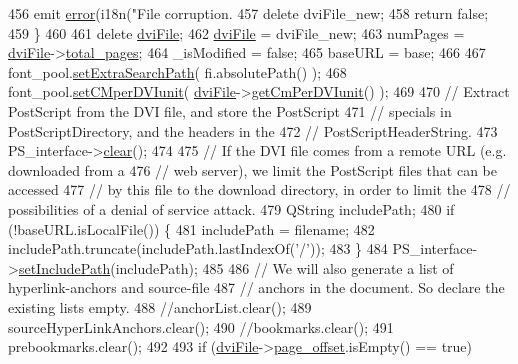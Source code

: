 \begin{DoxyCode}
{456       emit \hyperlink{classdviRenderer_ac3e658a3f6b99c724413fc1f5663f976}{error}(i18n(\textcolor{stringliteral}{"File corruption. %
457     \textcolor{keyword}{delete} dviFile\_new;
458     \textcolor{keywordflow}{return} \textcolor{keyword}{false};
459   \}
460 
461   \textcolor{keyword}{delete} \hyperlink{classdviRenderer_a67ded13a1a8da343aa0ee921ed96d4c2}{dviFile};
462   \hyperlink{classdviRenderer_a67ded13a1a8da343aa0ee921ed96d4c2}{dviFile} = dviFile\_new;
463   numPages = \hyperlink{classdviRenderer_a67ded13a1a8da343aa0ee921ed96d4c2}{dviFile}->\hyperlink{classdvifile_a71577dbd82a462b855abc96be3b369c5}{total\_pages};
464   \_isModified = \textcolor{keyword}{false};
465   baseURL = base;
466 
467   font\_pool.\hyperlink{classfontPool_aced1a76b1ac1ff2fd362a969c32b6367}{setExtraSearchPath}( fi.absolutePath() );
468   font\_pool.\hyperlink{classfontPool_a2460a35758f22529c57bf50e2ca94918}{setCMperDVIunit}( \hyperlink{classdviRenderer_a67ded13a1a8da343aa0ee921ed96d4c2}{dviFile}->\hyperlink{classdvifile_a59a8b5b2c7b0ae199f4183b6062e6fb0}{getCmPerDVIunit}() );
469 
470   \textcolor{comment}{// Extract PostScript from the DVI file, and store the PostScript}
471   \textcolor{comment}{// specials in PostScriptDirectory, and the headers in the}
472   \textcolor{comment}{// PostScriptHeaderString.}
473   PS\_interface->\hyperlink{classghostscript__interface_ad304fbc79f41cc832e8fe4c01751fb46}{clear}();
474 
475   \textcolor{comment}{// If the DVI file comes from a remote URL (e.g. downloaded from a}
476   \textcolor{comment}{// web server), we limit the PostScript files that can be accessed}
477   \textcolor{comment}{// by this file to the download directory, in order to limit the}
478   \textcolor{comment}{// possibilities of a denial of service attack.}
479   QString includePath;
480   \textcolor{keywordflow}{if} (!baseURL.isLocalFile()) \{
481     includePath = filename;
482     includePath.truncate(includePath.lastIndexOf(\textcolor{charliteral}{'/'}));
483   \}
484   PS\_interface->\hyperlink{classghostscript__interface_a493c8915bc644ffa3abeb34e8bc79d65}{setIncludePath}(includePath);
485 
486   \textcolor{comment}{// We will also generate a list of hyperlink-anchors and source-file}
487   \textcolor{comment}{// anchors in the document. So declare the existing lists empty.}
488   \textcolor{comment}{//anchorList.clear();}
489   sourceHyperLinkAnchors.clear();
490   \textcolor{comment}{//bookmarks.clear();}
491   prebookmarks.clear();
492 
493   \textcolor{keywordflow}{if} (\hyperlink{classdviRenderer_a67ded13a1a8da343aa0ee921ed96d4c2}{dviFile}->\hyperlink{classdvifile_aeafc97277647ad5077a774be71b3253a}{page\_offset}.isEmpty() == \textcolor{keyword}{true})
}}
\end{DoxyCode}
